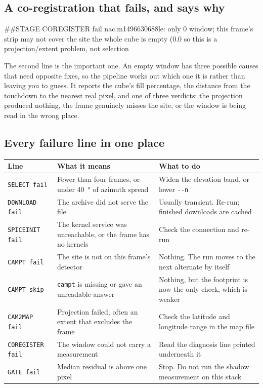\documentclass[11pt]{article}
\newcommand{\rd}[1]{\textcolor{termbad}{#1}}
\begin{document}
\subsection{A co-registration that fails, and says why}

\begin{console}
\begin{term}
##STAGE COREGISTER \rd{fail} nac.m1496630688le: only 0%
        window; this frame's strip may not cover the site
   the whole cube is empty (0.0%
   so this is a projection/extent problem, not selection
\end{term}
\end{console}

The second line is the important one. An empty window has three possible causes that
need opposite fixes, so the pipeline works out which one it is rather than leaving you
to guess. It reports the cube's fill percentage, the distance from the touchdown to
the nearest real pixel, and one of three verdicts: the projection produced nothing,
the frame genuinely misses the site, or the window is being read in the wrong place.

\subsection{Every failure line in one place}

\begin{center}
\small
\begin{tabular}{@{}l p{5.0cm} p{5.5cm}@{}}
\toprule
\sffamily\bfseries\color{hatinavy}Line & \sffamily\bfseries\color{hatinavy}What it means
& \sffamily\bfseries\color{hatinavy}What to do \\
\midrule
\texttt{SELECT fail} & Fewer than four frames, or under \SI{40}{\degree} of azimuth spread
& Widen the elevation band, or lower \texttt{-{}-n} \\
\texttt{DOWNLOAD fail} & The archive did not serve the file
& Usually transient. Re-run; finished downloads are cached \\
\texttt{SPICEINIT fail} & The kernel service was unreachable, or the frame has no kernels
& Check the connection and re-run \\
\texttt{CAMPT fail} & The site is not on this frame's detector
& Nothing. The run moves to the next alternate by itself \\
\texttt{CAMPT skip} & \texttt{campt} is missing or gave an unreadable answer
& Nothing, but the footprint is now the only check, which is weaker \\
\texttt{CAM2MAP fail} & Projection failed, often an extent that excludes the frame
& Check the latitude and longitude range in the map file \\
\texttt{COREGISTER fail} & The window could not carry a measurement
& Read the diagnosis line printed underneath it \\
\texttt{GATE fail} & Median residual is above one pixel
& Stop. Do not run the shadow measurement on this stack \\
\bottomrule
\end{tabular}
\end{center}
\end{document}
